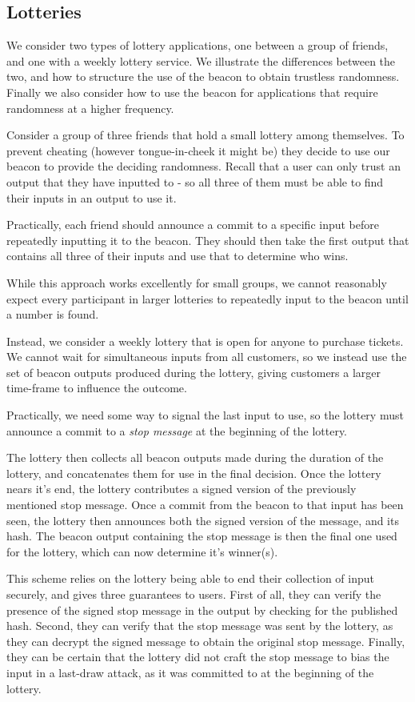
\subsection{Lotteries}
We consider two types of lottery applications, one between a group of friends, and one with a weekly lottery service. We illustrate the differences between the two, and how to structure the use of the beacon to obtain trustless randomness. Finally we also consider how to use the beacon for applications that require randomness at a higher frequency.

Consider a group of three friends that hold a small lottery among themselves. To prevent cheating (however tongue-in-cheek it might be) they decide to use our beacon to provide the deciding randomness. Recall that a user can only trust an output that they have inputted to - so all three of them must be able to find their inputs in an output to use it.

Practically, each friend should announce a commit to a specific input before repeatedly inputting it to the beacon. They should then take the first output that contains all three of their inputs and use that to determine who wins.

While this approach works excellently for small groups, we cannot reasonably expect every participant in larger lotteries to repeatedly input to the beacon until a number is found.

Instead, we consider a weekly lottery that is open for anyone to purchase tickets. We cannot wait for simultaneous inputs from all customers, so we instead use the set of beacon outputs produced during the lottery, giving customers a larger time-frame to influence the outcome.

Practically, we need some way to signal the last input to use, so the lottery must announce a commit to a \textit{stop message} at the beginning of the lottery.

The lottery then collects all beacon outputs made during the duration of the lottery, and concatenates them for use in the final decision. Once the lottery nears it's end, the lottery contributes a signed version of the previously mentioned stop message. Once a commit from the beacon to that input has been seen, the lottery then announces both the signed version of the message, and its hash. The beacon output containing the stop message is then the final one used for the lottery, which can now determine it's winner(s).

This scheme relies on the lottery being able to end their collection of input securely, and gives three guarantees to users. First of all, they can verify the presence of the signed stop message in the output by checking for the published hash. Second, they can verify that the stop message was sent by the lottery, as they can decrypt the signed message to obtain the original stop message. Finally, they can be certain that the lottery did not craft the stop message to bias the input in a last-draw attack, as it was committed to at the beginning of the lottery.

